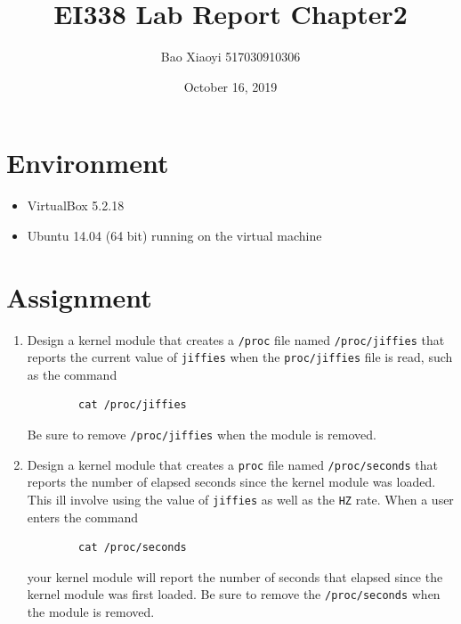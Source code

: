 \documentclass{article}
\title{EI338 Lab Report Chapter2}
\author{Bao Xiaoyi 517030910306}
\date{October 16,  2019}
\begin{document}
\maketitle

\section{Environment}
\begin{itemize}
    \item VirtualBox 5.2.18
    \item Ubuntu 14.04 (64 bit) running on the virtual machine
\end{itemize}

\section{Assignment}
\begin{enumerate}
    \item Design a kernel module that creates a \texttt{/proc}  file named \texttt{/proc/jiffies} that reports the current value of \texttt{jiffies} when the \texttt{proc/jiffies} file is read, such as the command 
    \begin{verbatim}
        cat /proc/jiffies
    \end{verbatim}
    Be sure to remove \texttt{/proc/jiffies} when the module is removed.
    \item Design a kernel module that creates a \texttt{proc} file named \texttt{/proc/seconds} that reports the number of elapsed seconds since the kernel module was loaded. This ill involve using the value of \texttt{jiffies} as well as the \texttt{HZ} rate. When a user enters the command
    \begin{verbatim}
        cat /proc/seconds
    \end{verbatim}
    your kernel module will report the number of seconds that elapsed since the kernel module was first loaded. Be sure to remove the \texttt{/proc/seconds} when the module is removed.
\end{enumerate}

\newpage
\end{document}
